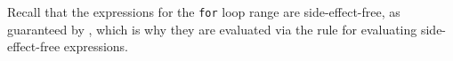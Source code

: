 \FormallyParagraph
Recall that the expressions for the \texttt{for} loop range are
side-effect-free, as guaranteed by , which is why
they are evaluated via the rule for evaluating side-effect-free expressions.
\begin{mathpar}
\end{mathpar}

